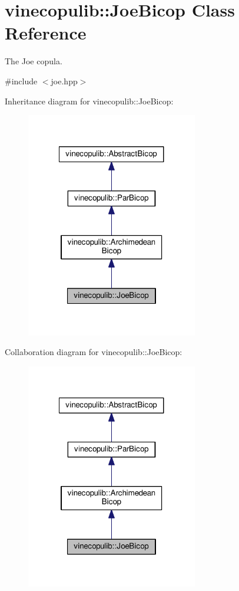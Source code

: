 \hypertarget{classvinecopulib_1_1_joe_bicop}{\section{vinecopulib\+:\+:Joe\+Bicop Class Reference}
\label{classvinecopulib_1_1_joe_bicop}
}


The Joe copula.  




{\ttfamily \#include $<$joe.\+hpp$>$}



Inheritance diagram for vinecopulib\+:\+:Joe\+Bicop\+:\nopagebreak
\begin{figure}[H]
\begin{center}
\leavevmode
\includegraphics[width=212pt]{classvinecopulib_1_1_joe_bicop__inherit__graph}
\end{center}
\end{figure}


Collaboration diagram for vinecopulib\+:\+:Joe\+Bicop\+:\nopagebreak
\begin{figure}[H]
\begin{center}
\leavevmode
\includegraphics[width=212pt]{classvinecopulib_1_1_joe_bicop__coll__graph}
\end{center}
\end{figure}
